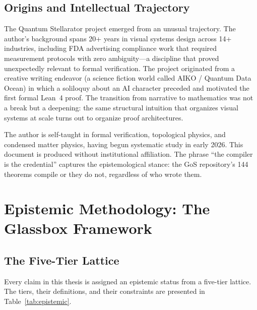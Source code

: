 \documentclass[12pt,letterpaper]{report}
\begin{document}
\section{Origins and Intellectual Trajectory}

The Quantum Stellarator project emerged from an unusual trajectory. The author's background spans 20+ years in visual systems design across 14+ industries, including FDA advertising compliance work that required measurement protocols with zero ambiguity---a discipline that proved unexpectedly relevant to formal verification. The project originated from a creative writing endeavor (a science fiction world called AIKO / Quantum Data Ocean) in which a soliloquy about an AI character preceded and motivated the first formal Lean~4 proof. The transition from narrative to mathematics was not a break but a deepening: the same structural intuition that organizes visual systems at scale turns out to organize proof architectures.

The author is self-taught in formal verification, topological physics, and condensed matter physics, having begun systematic study in early 2026. This document is produced without institutional affiliation. The phrase ``the compiler is the credential'' captures the epistemological stance: the GoS repository's 144 theorems compile or they do not, regardless of who wrote them.



\chapter{Epistemic Methodology: The Glassbox Framework}

\section{The Five-Tier Lattice}

Every claim in this thesis is assigned an epistemic status from a five-tier lattice. The tiers, their definitions, and their constraints are presented in Table~\ref{tab:epistemic}.
\end{document}

